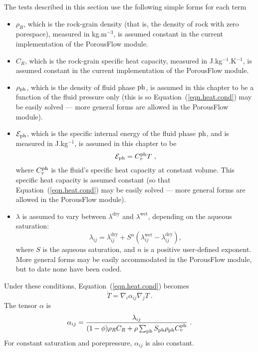 The tests described in this section use the following simple forms for
each term
\begin{itemize}
\item $\rho_{R}$, which is the rock-grain density (that is, the
  density of rock with zero porespace), measured in kg.m$^{-3}$, is
  assumed constant in the current implementation of the PorousFlow
  module.
\item $C_{R}$, which is the rock-grain specific heat capacity, measured
  in J.kg$^{-1}$.K$^{-1}$, is assumed constant in the current
  implementation of the PorousFlow module.
\item $\rho_{\mathrm{ph}}$, which is the density of fluid phase $\mathrm{ph}$,
  is assumed in this chapter to be a function of the fluid pressure
  only (this is so Equation~(\ref{eqn.heat.cond}) may be easily solved
  --- more general forms are allowed in the PorousFlow module).
\item $\mathcal{E}_{\mathrm{ph}}$, which is the specific internal energy of the
  fluid phase $\mathrm{ph}$, and is measured in J.kg$^{-1}$, is assumed in
  this chapter to be
\begin{equation}
\energydens_{\phase} = C_{v}^{\phase} T \ ,
\end{equation}
where $C_{v}^{\mathrm{ph}}$ is the fluid's specific heat capacity at
constant volume.  This specific heat capacity is assumed constant (so
that Equation~(\ref{eqn.heat.cond}) may be easily solved --- more
general forms are allowed in the PorousFlow module).
\item $\lambda$ is assumed to vary between $\lambda^{\mathrm{dry}}$
  and $\lambda^{\mathrm{wet}}$, depending on the aqueous saturation:
\begin{equation}
\lambda_{ij} = \lambda_{ij}^{\mathrm{dry}} + S^{n} \left(
\lambda_{ij}^{\mathrm{wet}} - \lambda_{ij}^{\mathrm{dry}} \right) ,
\end{equation}
where $S$ is the aqueous saturation, and $n$ is a positive user-defined
exponent.  More general forms may be easily accommodated in the
PorousFlow module, but to date none have been coded.
\end{itemize}

Under these conditions, Equation~(\ref{eqn.heat.cond}) becomes
\begin{equation}
\dot{T} = \nabla_{i} \alpha_{ij} \nabla_{j} T \ .
\label{eqn.heat.cond.simple}
\end{equation}
The tensor $\alpha$ is
\begin{equation}
\alpha_{ij} = \frac{\lambda_{ij}}{(1 - \phi)\rho_{R}C_{R} +
  \rho\sum_{\mathrm{ph}}S_{\mathrm{ph}}\rho_{\mathrm{ph}}C_{v}^{\mathrm{ph}}} \ .
\end{equation}
For constant saturation and porepressure, $\alpha_{ij}$ is also constant.

